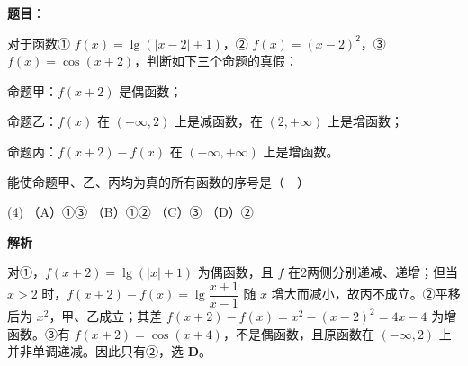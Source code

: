 \begin{answer}

\textbf{题目}：

对于函数① $f(x)=\lg(|x-2|+1)$，② $f(x)=(x-2)^2$，③ $f(x)=\cos(x+2)$，判断如下三个命题的真假：

命题甲：$f(x+2)$ 是偶函数；

命题乙：$f(x)$ 在 $(-\infty,2)$ 上是减函数，在 $(2,+\infty)$ 上是增函数；

命题丙：$f(x+2)-f(x)$ 在 $(-\infty,+\infty)$ 上是增函数。

能使命题甲、乙、丙均为真的所有函数的序号是（　）

\begin{gkopts}(4)
\task （A）①③
\task （B）①②
\task （C）③
\task （D）②
\end{gkopts}

\textbf{解析}

对①，$f(x+2)=\lg(|x|+1)$ 为偶函数，且 $f$ 在2两侧分别递减、递增；但当 $x>2$ 时，$f(x+2)-f(x)=\lg\dfrac{x+1}{x-1}$ 随 $x$ 增大而减小，故丙不成立。②平移后为 $x^2$，甲、乙成立；其差 $f(x+2)-f(x)=x^2-(x-2)^2=4x-4$ 为增函数。③有 $f(x+2)=\cos(x+4)$，不是偶函数，且原函数在 $(-\infty,2)$ 上并非单调递减。因此只有②，选 \textbf{D}。


\end{answer}

